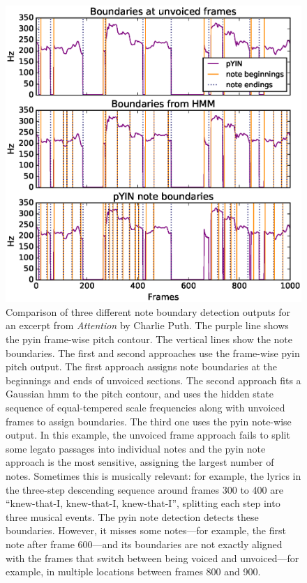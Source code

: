 \begin{figure}[h]
    \centering
    \includegraphics[width=\columnwidth]{figures/note_parse_comparison_attention_5.eps}
    \caption{Comparison of three different note boundary detection outputs for an excerpt from \textit{Attention} by Charlie Puth. The purple line shows the \gls{pyin} frame-wise pitch contour. The vertical lines show the note boundaries. The first and second approaches use the frame-wise \gls{pyin} pitch output. The first approach assigns note boundaries at the beginnings and ends of unvoiced sections. The second approach fits a Gaussian \gls{hmm} to the pitch contour, and uses the hidden state sequence of equal-tempered scale frequencies along with unvoiced frames to assign boundaries. The third one uses the \gls{pyin} note-wise output. In this example, the unvoiced frame approach fails to split some legato passages into individual notes and the \gls{pyin} note approach is the most sensitive, assigning the largest number of notes. Sometimes this is musically relevant: for example, the lyrics in the three-step descending sequence around frames 300 to 400 are ``knew-that-I, knew-that-I, knew-that-I'', splitting each step into three musical events. The \gls{pyin} note detection detects these boundaries. However, it misses some notes---for example, the first note after frame 600---and its boundaries are not exactly aligned with the frames that switch between being voiced and unvoiced---for example, in multiple locations between frames 800 and 900.}
    \label{fig:note-parsing}
\end{figure}

